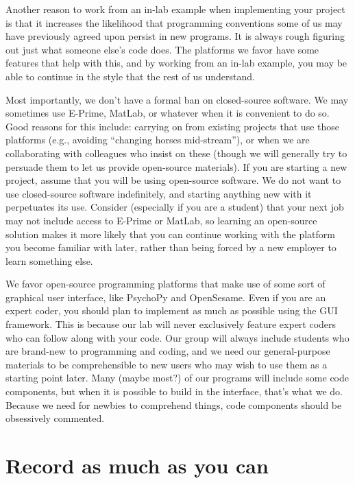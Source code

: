 \documentclass[
  12pt,
]{book}
\begin{document}
Another reason to work from an in-lab example when implementing your project is that it increases the likelihood that programming conventions some of us may have previously agreed upon persist in new programs. It is always rough figuring out just what someone else's code does. The platforms we favor have some features that help with this, and by working from an in-lab example, you may be able to continue in the style that the rest of us understand.

Most importantly, we don't have a formal ban on closed-source software. We may sometimes use E-Prime, MatLab, or whatever when it is convenient to do so. Good reasons for this include: carrying on from existing projects that use those platforms (e.g., avoiding ``changing horses mid-stream''), or when we are collaborating with colleagues who insist on these (though we will generally try to persuade them to let us provide open-source materials). If you are starting a new project, assume that you will be using open-source software. We do not want to use closed-source software indefinitely, and starting anything new with it perpetuates its use. Consider (especially if you are a student) that your next job may not include access to E-Prime or MatLab, so learning an open-source solution makes it more likely that you can continue working with the platform you become familiar with later, rather than being forced by a new employer to learn something else.

We favor open-source programming platforms that make use of some sort of graphical user interface, like PsychoPy and OpenSesame. Even if you are an expert coder, you should plan to implement as much as possible using the GUI framework. This is because our lab will never exclusively feature expert coders who can follow along with your code. Our group will always include students who are brand-new to programming and coding, and we need our general-purpose materials to be comprehensible to new users who may wish to use them as a starting point later. Many (maybe most?) of our programs will include some code components, but when it is possible to build in the interface, that's what we do. Because we need for newbies to comprehend things, code components should be obsessively commented.

\section{Record as much as you can}\label{record-as-much-as-you-can}
\end{document}
